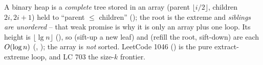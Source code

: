 \begin{recallbox}
A binary heap is a \emph{complete} tree stored in an array (parent $\lfloor i/2\rfloor$, children
$2i,2i{+}1$) held to ``parent $\le$ children'' (); the root is the extreme and
\emph{siblings are unordered} -- that weak promise is why it is only an array plus one loop. Its height is
$\lfloor\lg n\rfloor$ (), so  (sift-up a new leaf) and  (refill the
root, sift-down) are each $O(\log n)$ (, ); the array is
\emph{not} sorted. LeetCode 1046 () is the pure extract-extreme loop, and LC 703 the
size-$k$ frontier.
\end{recallbox}
